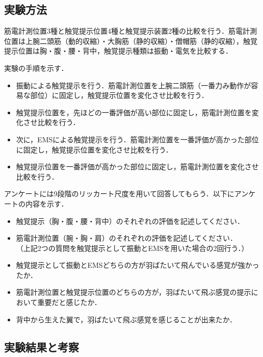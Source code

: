 \begin{small}
  \subsection{実験方法}
        筋電計測位置3種と触覚提示位置4種と触覚提示装置2種の比較を行う．筋電計測位置は上腕二頭筋（動的収縮）・大胸筋（静的収縮）・僧帽筋（静的収縮），触覚提示位置は胸・腹・腰・背中，触覚提示種類は振動・電気を比較する．

        実験の手順を示す．
        \begin{itemize}
        \item 振動による触覚提示を行う．筋電計測位置を上腕二頭筋（一番力み動作が容易な部位）に固定し，触覚提示位置を変化させ比較を行う．
        \item 触覚提示位置を，先ほどの一番評価が高い部位に固定し，筋電計測位置を変化させ比較を行う．
        \item 次に，EMSによる触覚提示を行う．筋電計測位置を一番評価が高かった部位に固定し，触覚提示位置を変化させ比較を行う．
        \item 触覚提示位置を一番評価が高かった部位に固定し，筋電計測位置を変化させ比較を行う．
        \end{itemize}


        アンケートには9段階のリッカート尺度を用いて回答してもらう．以下にアンケートの内容を示す．
        \begin{itemize}
        \item 触覚提示（胸・腹・腰・背中）のそれぞれの評価を記述してください．
        \item 筋電計測位置（腕・胸・肩）のそれぞれの評価を記述してください．\\
        （上記2つの質問を触覚提示として振動とEMSを用いた場合の2回行う．）
        \item  触覚提示として振動とEMSどちらの方が羽ばたいて飛んでいる感覚が強かったか．
        \item 筋電計測位置と触覚提示位置のどちらの方が，羽ばたいて飛ぶ感覚の提示において重要だと感じたか．
        \item 背中から生えた翼で，羽ばたいて飛ぶ感覚を感じることが出来たか．
        \end{itemize}


  \subsection{実験結果と考察}


\end{small}
